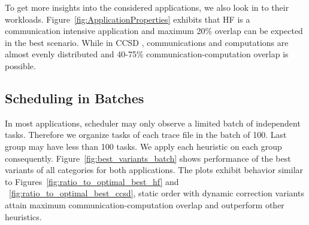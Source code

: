 \documentclass[sigconf]{acmart}
\begin{document}
{		
		
		
		To get more insights into the considered applications, we also look in to their workloads. Figure~\ref{fig:ApplicationProperties} exhibits that HF is a communication intensive application and maximum 20\% overlap can be expected in the best scenario. While in CCSD , communications and computations are almost evenly distributed and 40-75\% communication-computation overlap is possible.
		
		
		
		
		\subsection{Scheduling in Batches}
		In most applications, scheduler may only observe a limited batch of independent tasks. Therefore we organize tasks of each trace file in the batch of 100. Last group may have less than 100 tasks. We apply each heuristic on each group consequently. Figure~\ref{fig:best_variants_batch} shows performance of the best variants of all categories for both applications. The plots exhibit behavior similar to Figures~\ref{fig:ratio_to_optimal_best_hf} and ~\ref{fig:ratio_to_optimal_best_ccsd}, static order with dynamic correction variants attain maximum communication-computation overlap and outperform other heuristics.
		
		
}
\end{document}
